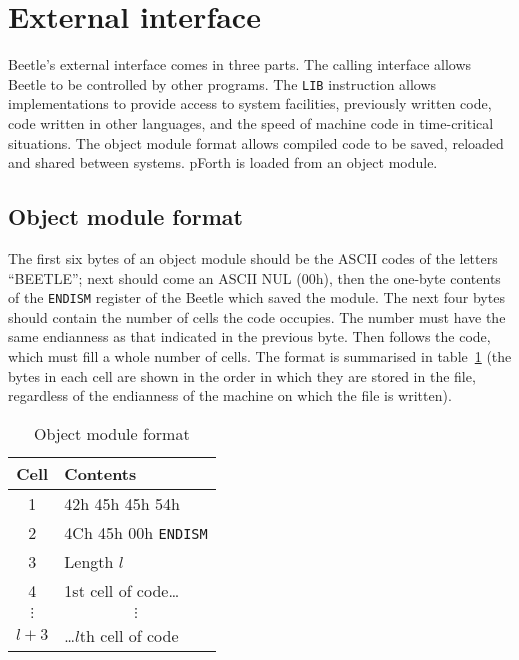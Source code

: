 \documentclass[english]{article}
\begin{document}
\section{External interface}

Beetle's external interface comes in three parts. The calling interface allows
Beetle to be controlled by other programs. The {\tt LIB} instruction allows
implementations to provide access to system facilities, previously written code,
code written in other languages, and the speed of machine code in time-critical
situations. The object module format allows compiled code to be saved, reloaded
and shared between systems. pForth is loaded from an object module.


\subsection{Object module format}
\label{object}

The first six bytes of an object module should be the ASCII codes of the letters
``BEETLE''; next should come an ASCII NUL (00h), then the one-byte contents of
the {\tt ENDISM} register of the Beetle which saved the module. The next four
bytes should contain the number of cells the code occupies. The number must have
the same endianness as that indicated in the previous byte. Then follows the
code, which must fill a whole number of cells. The format is summarised in table~\ref{objecttable}
(the bytes in each cell are shown in the order in which they
are stored in the file, regardless of the endianness of the machine on which the
file is written).

\begin{table}[htbp]
\begin{center}
\begin{tabular}{cl} \toprule
\bf Cell & \bf Contents \\ \midrule
1 & 42h 45h 45h 54h \\
2 & 4Ch 45h 00h {\tt ENDISM} \\
3 & Length $l$\/ \\
4 & 1st cell of code\dots \\
$\vdots$ & \multicolumn{1}{c}{$\vdots$} \\
$l+3$\/ & \dots$l$\/th cell of code \\ \bottomrule
\end{tabular}
\caption{\label{objecttable}Object module format}
\end{center}
\end{table}
\end{document}

